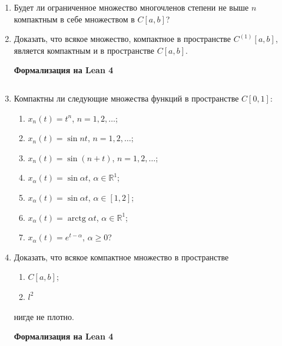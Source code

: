\documentclass[12pt,a4paper]{article}
\begin{document}
\begin{enumerate}
\begin{center}\small\textbf{Формализация на Lean 4}\end{center}
\inputminted{lean}{FunAn/Section20_CompactSets/Task03.lean}

\newpage

\item Будет ли ограниченное множество многочленов степени не выше $n$ компактным в себе множеством в $C[a,b]$?

\newpage
\item Доказать, что всякое множество, компактное в пространстве $C^{(1)}[a,b]$, является компактным и в пространстве $C[a,b]$.


\begin{center}\small\textbf{Формализация на Lean 4}\end{center}
\inputminted{lean}{FunAn/Section20_CompactSets/Task05.lean}

\newpage

\item Компактны ли следующие множества функций в пространстве $C[0,1]$:
\begin{enumerate}[label=\alph*)]
\item $x_{n}(t) = t^{n}$, $n=1,2,\dots$;
\item $x_{n}(t) = \sin nt$, $n=1,2,\dots$;
\item $x_{n}(t) = \sin(n+t)$, $n=1,2,\dots$;
\item $x_{\alpha}(t) = \sin \alpha t$, $\alpha \in \mathbb{R}^{1}$;
\item $x_{\alpha}(t) = \sin \alpha t$, $\alpha \in [1,2]$;
\item $x_{\alpha}(t) = \operatorname{arctg} \alpha t$, $\alpha \in \mathbb{R}^{1}$;
\item $x_{\alpha}(t) = e^{t-\alpha}$, $\alpha \ge 0$?
\end{enumerate}

\newpage
\item Доказать, что всякое компактное множество в пространстве
\begin{enumerate}[label=\alph*)]
\item $C[a,b]$;
\item $l^{2}$
\end{enumerate}
нигде не плотно.


\begin{center}\small\textbf{Формализация на Lean 4}\end{center}
\inputminted{lean}{FunAn/Section20_CompactSets/Task07.lean}


\end{enumerate}
\end{document}
